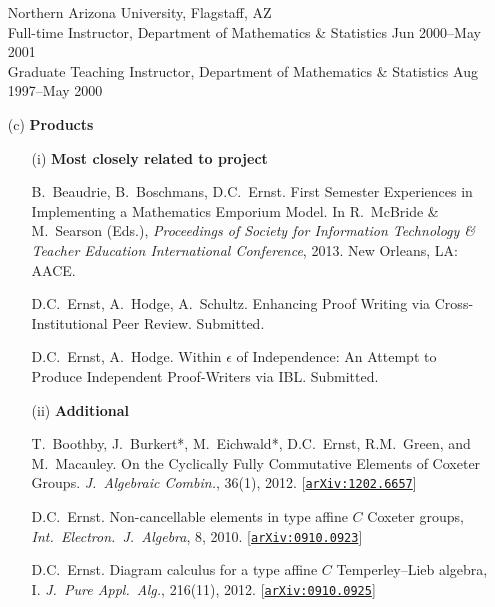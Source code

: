 \documentclass[11pt]{article}
\begin{document}
\begin{enumerate}[leftmargin=*]
\vspace{.25em}

Northern Arizona University, Flagstaff, AZ\\
Full-time Instructor, Department of Mathematics \& Statistics \hfill Jun 2000--May 2001\\
Graduate Teaching Instructor, Department of Mathematics \& Statistics \hfill Aug 1997--May 2000

\item[(c)] \textbf{Products}

\begin{enumerate}[leftmargin=\parindent]
\item[(i)] \textbf{Most closely related to project}

B.~Beaudrie, B.~Boschmans, D.C.~Ernst. First Semester Experiences in Implementing a Mathematics Emporium Model. In R.~McBride \& M.~Searson (Eds.), \emph{Proceedings of Society for Information Technology \& Teacher Education International Conference}, 2013.  New Orleans, LA: AACE.

\vspace{.25em}

D.C.~Ernst, A.~Hodge, A.~Schultz.  Enhancing Proof Writing via Cross-Institutional Peer Review. Submitted.

\vspace{.25em}

D.C.~Ernst, A.~Hodge. Within $\epsilon$ of Independence: An Attempt to Produce Independent Proof-Writers via IBL. Submitted.
 
\item[(ii)] \textbf{Additional}

T.~Boothby, J.~Burkert*, M.~Eichwald*, D.C.~Ernst, R.M.~Green, and M.~Macauley. On the Cyclically Fully Commutative Elements of Coxeter Groups.  \emph{J.~Algebraic Combin.}, 36(1), 2012.  [\href{http://arxiv.org/abs/1202.6657}{\texttt{arXiv:1202.6657}}]

\vspace{.25em}

\noindent D.C.~Ernst.  Non-cancellable elements in type affine $C$ Coxeter groups,  \emph{Int.~Electron.~J.~Algebra}, 8, 2010.  [\href{http://arxiv.org/abs/0910.0923}{\texttt{arXiv:0910.0923}}]

\vspace{.25em}

D.C.~Ernst.  Diagram calculus for a type affine $C$ Temperley--Lieb algebra, I. \emph{J.~Pure Appl.~Alg.}, 216(11), 2012. [\href{http://arxiv.org/abs/0910.0925}{\texttt{arXiv:0910.0925}}]
\end{enumerate}
 

\end{enumerate}
\end{document}
